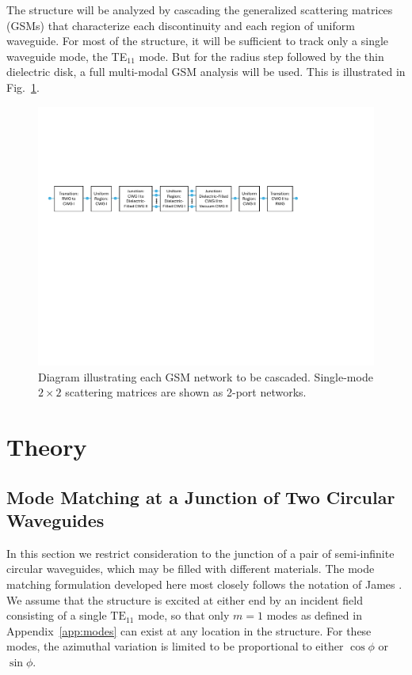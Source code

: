 \documentclass[11pt]{article}
\newcommand{\fref}[1]{Fig.~\ref{#1}}
\newcommand{\TE}{\text{TE}}
\begin{document}
The structure will be analyzed by cascading the generalized scattering matrices (GSMs) that characterize
each discontinuity and each region of uniform waveguide. For most of the structure, it will be sufficient
to track only a single waveguide mode, the TE$_{11}$ mode.  But for the radius step followed by the thin
dielectric disk, a full multi-modal GSM analysis will be used. This is illustrated in \fref{fig:fullschematic}.
%
\begin{figure}
  \centering
  \includegraphics[angle=90,origin=c,scale=0.8]{full_schematic.pdf}
  \caption{Diagram illustrating each GSM network to be cascaded.  Single-mode $2\times2$ scattering matrices are
  shown as 2-port networks.}
    \label{fig:fullschematic}
\end{figure}


\section{Theory}
\label{sec:theory}


\subsection{Mode Matching at a Junction of Two Circular Waveguides}
\label{sec:modematch}
In this section we restrict consideration to the junction of a pair of semi-infinite circular waveguides,
which may be filled with different materials.
The mode matching formulation developed here most closely
follows the notation of James \cite{jame:81}.
We assume that the structure is excited at either end by an incident field
consisting of a single $\TE_{11}$ mode, so that only $m=1$ modes as
defined in Appendix~\ref{app:modes} can exist at any location in the
structure. For these modes, the azimuthal variation is limited to be
proportional to either $\cos\phi$ or $\sin\phi$.
\end{document}
